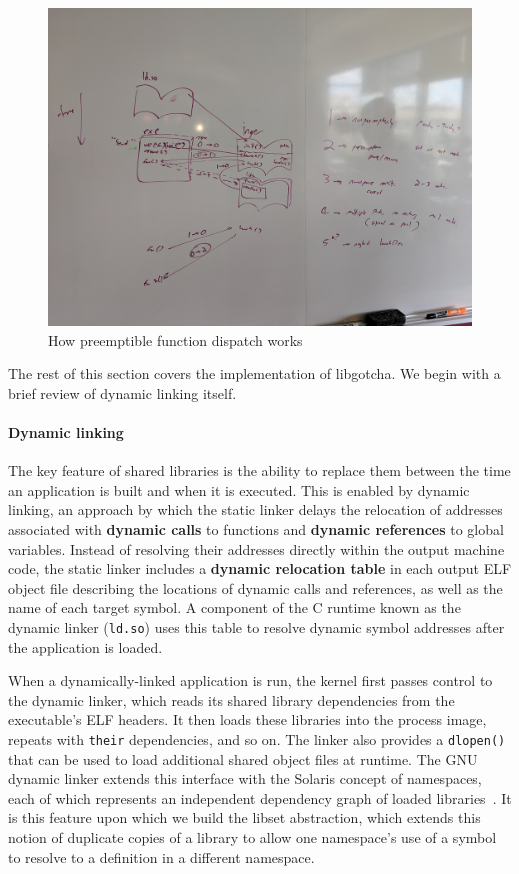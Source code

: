 \begin{figure}
\includegraphics[width=\columnwidth]{figs/calltree}
\caption{How preemptible function dispatch works}
\label{fig:callwhitelist}
\end{figure}

The rest of this section covers the implementation of libgotcha.  We begin with a
brief review of dynamic linking itself.

\paragraph{Dynamic linking}

The key feature of shared libraries is the ability to replace them between the time
an
application is built and when it is executed.  This is enabled by dynamic linking, an
approach by which the static linker delays the relocation of addresses associated
with \textbf{dynamic calls} to functions and \textbf{dynamic references} to global
variables.  Instead of resolving their addresses directly within the output machine
code, the static linker includes a
\textbf{dynamic relocation table} in each output ELF object file describing the
locations of dynamic calls and references, as well as the name of each target symbol.
A component of the C runtime known as the dynamic linker (\texttt{ld.so}) uses this
table to resolve dynamic symbol addresses after the application is loaded.

When a dynamically-linked application is run, the kernel first passes control to the
dynamic linker, which reads its shared library dependencies from the executable's ELF
headers.  It then loads these libraries into the process image, repeats with
\texttt{their} dependencies, and so on.  The linker also provides a \texttt{dlopen()}
that can be used to load additional shared object files at runtime.  The GNU dynamic
linker extends this interface with the Solaris concept of namespaces, each of which
represents an independent dependency graph of loaded
libraries~\cite{dlmopen-manpage}.  It is this feature upon which we build the libset
abstraction, which extends this notion of duplicate copies of a library to allow one
namespace's use of a symbol to resolve to a definition in a different namespace.

